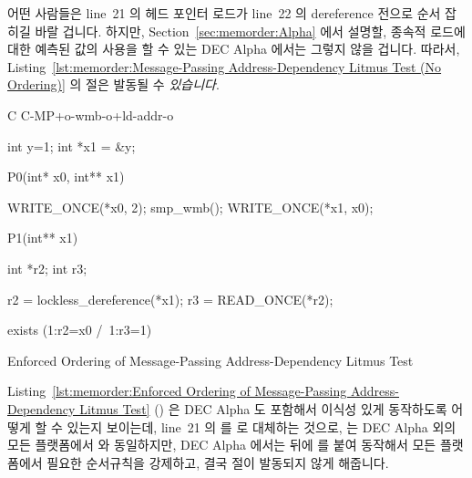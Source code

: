 어떤 사람들은 line~21 의 헤드 포인터 로드가 line~22 의 dereference 전으로 순서
잡히길 바랄 겁니다.
하지만,
Section~\ref{sec:memorder:Alpha} 에서 설명할, 종속적 로드에 대한 예측된 값의
사용을 할 수 있는 DEC Alpha 에서는 그렇지 않을 겁니다.
따라서,
Listing~\ref{lst:memorder:Message-Passing Address-Dependency Litmus Test (No Ordering)}
의  절은 발동될 수 \emph{있습니다}.

\begin{listing}[tbp]
{ \scriptsize
\begin{verbbox}[\LstLineNo]
C C-MP+o-wmb-o+ld-addr-o

{
int y=1;
int *x1 = &y;
}

P0(int* x0, int** x1) {

  WRITE_ONCE(*x0, 2);
  smp_wmb();
  WRITE_ONCE(*x1, x0);

}

P1(int** x1) {

  int *r2;
  int r3;

  r2 = lockless_dereference(*x1);
  r3 = READ_ONCE(*r2);

}

exists (1:r2=x0 /\ 1:r3=1)
\end{verbbox}
}
\centering
\theverbbox
\caption{Enforced Ordering of Message-Passing Address-Dependency Litmus Test}
\label{lst:memorder:Enforced Ordering of Message-Passing Address-Dependency Litmus Test}
\end{listing}

Listing~\ref{lst:memorder:Enforced Ordering of Message-Passing Address-Dependency Litmus Test}
()
은 DEC Alpha 도 포함해서 이식성 있게 동작하도록 어떻게 할 수 있는지 보이는데,
line~21 의  를  로 대체하는 것으로,
 는 DEC Alpha 외의 모든 플랫폼에서 
와 동일하지만, DEC Alpha 에서는  뒤에  를 붙여
동작해서 모든 플랫폼에서 필요한 순서규칙을 강제하고, 결국  절이
발동되지 않게 해줍니다.
\iffalse


